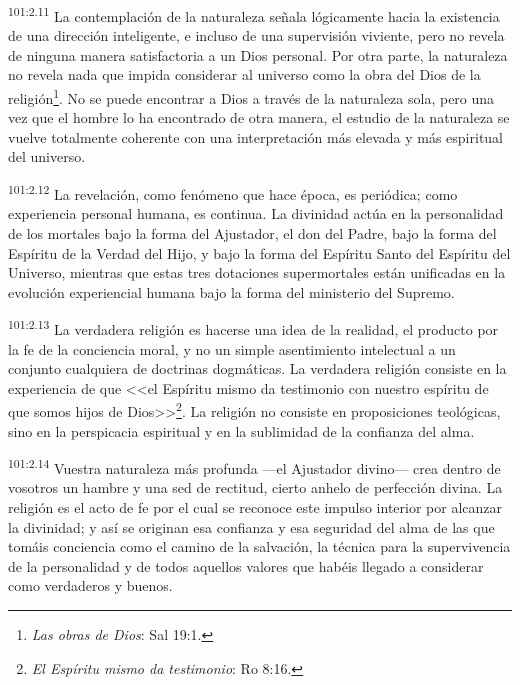 \par
\textsuperscript{101:2.11} La contemplación de la naturaleza señala lógicamente hacia la existencia de una dirección inteligente, e incluso de una supervisión viviente, pero no revela de ninguna manera satisfactoria a un Dios personal. Por otra parte, la naturaleza no revela nada que impida considerar al universo como la obra del Dios de la religión\footnote{\textit{Las obras de Dios}: Sal 19:1.}. No se puede encontrar a Dios a través de la naturaleza sola, pero una vez que el hombre lo ha encontrado de otra manera, el estudio de la naturaleza se vuelve totalmente coherente con una interpretación más elevada y más espiritual del universo.

\par
\textsuperscript{101:2.12} La revelación, como fenómeno que hace época, es periódica; como experiencia personal humana, es continua. La divinidad actúa en la personalidad de los mortales bajo la forma del Ajustador, el don del Padre, bajo la forma del Espíritu de la Verdad del Hijo, y bajo la forma del Espíritu Santo del Espíritu del Universo, mientras que estas tres dotaciones supermortales están unificadas en la evolución experiencial humana bajo la forma del ministerio del Supremo.

\par
\textsuperscript{101:2.13} La verdadera religión es hacerse una idea de la realidad, el producto por la fe de la conciencia moral, y no un simple asentimiento intelectual a un conjunto cualquiera de doctrinas dogmáticas. La verdadera religión consiste en la experiencia de que <<el Espíritu mismo da testimonio con nuestro espíritu de que somos hijos de Dios>>\footnote{\textit{El Espíritu mismo da testimonio}: Ro 8:16.}. La religión no consiste en proposiciones teológicas, sino en la perspicacia espiritual y en la sublimidad de la confianza del alma.

\par
\textsuperscript{101:2.14} Vuestra naturaleza más profunda ---el Ajustador divino--- crea dentro de vosotros un hambre y una sed de rectitud, cierto anhelo de perfección divina. La religión es el acto de fe por el cual se reconoce este impulso interior por alcanzar la divinidad; y así se originan esa confianza y esa seguridad del alma de las que tomáis conciencia como el camino de la salvación, la técnica para la supervivencia de la personalidad y de todos aquellos valores que habéis llegado a considerar como verdaderos y buenos.

